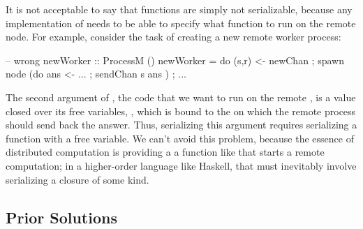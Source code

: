 \documentclass[preprint]{sigplanconf}
\newcommand\je[1]{\nb{jeff}{#1}}
\begin{document}
It is not acceptable to say that functions are simply not
serializable, because any implementation of  needs to be able to specify what function to run on the remote node.
For example, consider the task of creating a new remote worker process:
\needspace{7ex}
\begin{code}
  -- wrong
  newWorker :: ProcessM ()
  newWorker = do { (s,r) <- newChan
          			 ; spawn node (do { ans <- ...
                           			  ; sendChan s ans })
          			 ; ... }
\end{code}
The second argument of , the code that we want to run on the remote , is a value closed over
its free variables, , which is bound to the  on which
the remote process should send back the answer.
Thus, serializing this argument requires serializing a function with a free variable.
We can't avoid this problem, because the essence of distributed computation is providing a a function like  that starts a remote computation; in a higher-order language like Haskell, that must inevitably
involve serializing a closure of some kind.

\subsection{Prior Solutions}
\end{document}
